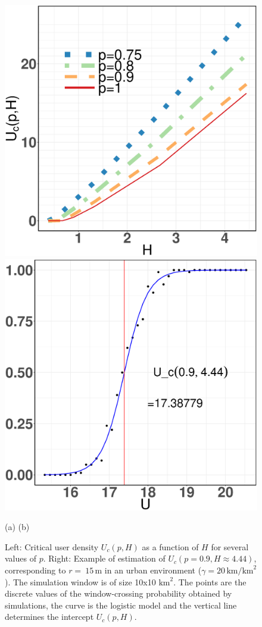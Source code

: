 \documentclass[conference]{IEEEtran}
\begin{document}
\begin{figure}[t!]
\centerline{
\includegraphics[width=0.48\linewidth]{Figures/critical-U-several-p}
\hspace{0.01\linewidth}
\includegraphics[width=0.48\linewidth]{Figures/Uc-twovar-example}}
\vspace{-1ex}
\centerline{\footnotesize\hspace{0.25\linewidth} (a)\hspace{0.5\linewidth} (b) \hspace{0.25\linewidth}\ }
\vspace{-1ex}
\caption{Left: Critical user density $U_c(p,H)$ as a function of $H$ for several values of $p$. Right: Example of estimation of $U_{c}(p=0.9,H \approx 4.44)$, corresponding to $r=~15 \, \text{m}$ in an urban environment ($\gamma = 20 \, \text{km/km}^{2}$). The simulation window is of size 10x10 $\text{km}^{2}$. The points are the discrete values of the window-crossing probability obtained by simulations,  the curve is the logistic model and the vertical line determines the intercept $U_{c}(p,H)$. }
\label{critical-user-estimation-twovar}
\vspace{-2ex}
\end{figure}
\end{document}
